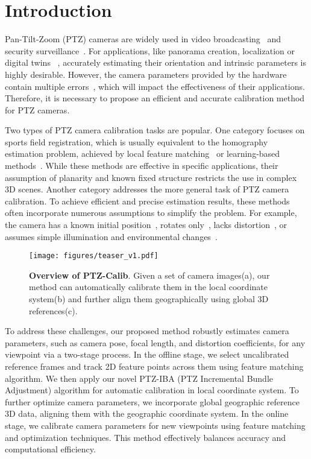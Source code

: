 \section{Introduction}

Pan-Tilt-Zoom (PTZ) cameras are widely used in video broadcasting~\cite{Liu:2023:LAC,homayounfar2017sports} and security surveillance~\cite{Wu:2013:KPTZ, Eldrandaly:2019:Coverage}. For applications, like panorama creation, localization or digital twins ~\cite{lalonde2007system,rameau2013self,wu2012keeping,Song:2006:Traffic}, accurately estimating their orientation and intrinsic parameters is highly desirable.
However, the camera parameters provided by the hardware contain multiple errors~\cite{Wu:2013:KPTZ}, which will impact the effectiveness of their applications. Therefore, it is necessary to propose an efficient and accurate calibration method for PTZ cameras.

Two types of PTZ camera calibration tasks are popular. One category focuses on sports field registration, which is usually equivalent to the homography estimation problem, achieved by local feature matching~\cite{homayounfar2017sports,Gupta:2011:ULE,Nie2021ARA,Sha:2020:EtE} or learning-based methods~\cite{jiang2020optimizing,SFLNet}.
While these methods are effective in specific applications, their assumption of planarity and known fixed structure restricts the use in complex 3D scenes. Another category addresses the more general task of PTZ camera calibration. To achieve efficient and precise estimation results, these methods often incorporate numerous assumptions to simplify the problem. For example, the camera has a known initial position~\cite{PTZ-SLAM}, rotates only~\cite{selfcalib1997}, lacks distortion~\cite{chen2018two}, or assumes simple illumination and environmental changes~\cite{Sinha:2006:Mosaic}. 

\begin{figure}[!t]
    \centering
    \texttt{[image: figures/teaser\_v1.pdf]}
    \caption{\textbf{Overview of PTZ-Calib}. Given a set of camera images(a), our method can automatically calibrate them in the local coordinate system(b) and further align them geographically using global 3D references(c).}
    \label{fig:teaser}
\end{figure}

To address these challenges, our proposed method robustly estimates camera parameters, such as camera pose, focal length, and distortion coefficients, for any viewpoint via a two-stage process. In the offline stage, we select uncalibrated reference frames and track 2D feature points across them using feature matching algorithm. We then apply our novel PTZ-IBA (PTZ Incremental Bundle Adjustment) algorithm for automatic calibration in local coordinate system. To further optimize camera parameters, we incorporate global geographic reference 3D data, aligning them with the geographic coordinate system.
In the online stage, we calibrate camera parameters for new viewpoints using feature matching and optimization techniques.
This method effectively balances accuracy and computational efficiency.

